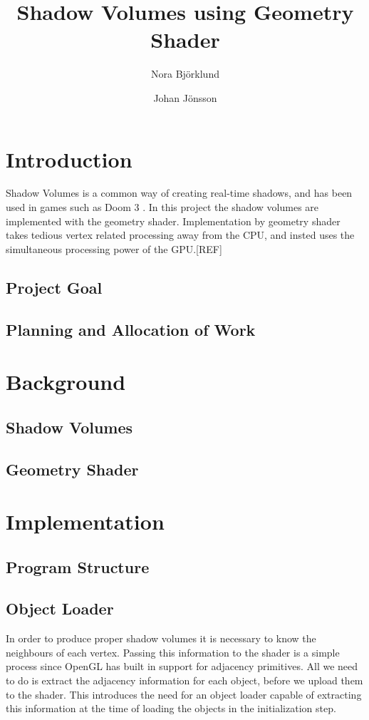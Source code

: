 \documentclass[a4paper, 12pt]{article}
\title{Shadow Volumes using Geometry Shader}
\author{Nora Björklund \and Johan Jönsson}
\begin{document}
\maketitle
\tableofcontents
\newpage
\section{Introduction}
Shadow Volumes is a common way of creating real-time shadows, and has been used
in games such as Doom 3 \cite{gpug1}. In this project the shadow volumes are implemented with the geometry shader. Implementation by geometry shader takes tedious vertex related processing away from the CPU, and insted uses the simultaneous processing power of the GPU.[REF]
\subsection{Project Goal}
\subsection{Planning and Allocation of Work}
\section{Background}
\subsection{Shadow Volumes}
\subsection{Geometry Shader}
\section{Implementation}
\subsection{Program Structure}
\subsection{Object Loader}
In order to produce proper shadow volumes it is necessary to know the neighbours
of each vertex. Passing this information to the shader is a simple process since
OpenGL has built in support for adjacency primitives. All we need to do is
extract the adjacency information for each object, before we upload them to the
shader. This introduces the need for an object loader capable of extracting this
information at the time of loading the objects in the initialization step.
\end{document}
